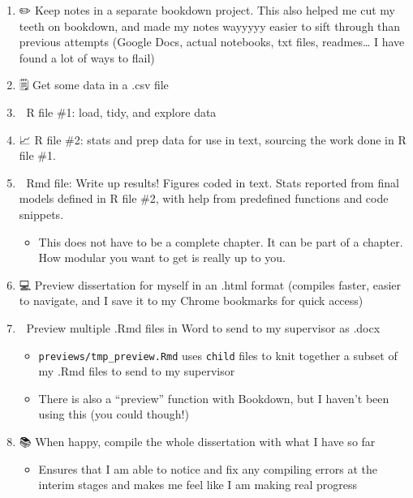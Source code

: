 \documentclass[
  12pt,
  oneside]{book}
\providecommand{\tightlist}{%
  \setlength{\itemsep}{0pt}\setlength{\parskip}{0pt}}
\numberwithin{figure}{chapter}
\begin{document}
\begin{enumerate}
\def\labelenumi{\arabic{enumi}.}
\setcounter{enumi}{-1}
\item
  ✏️
  Keep notes in a separate bookdown project. This also helped me cut my teeth on bookdown, and made my notes wayyyyy easier to sift through than previous attempts (Google Docs, actual notebooks, txt files, readmes\ldots{} I have found a lot of ways to flail)
\item
  🗒
  Get some data in a .csv file
\item
  🧹
  R file \#1: load, tidy, and explore data
\item
  📈
  R file \#2: stats and prep data for use in text, sourcing the work done in R file \#1.
\item
  📖
  Rmd file: Write up results! Figures coded in text. Stats reported from final models defined in R file \#2, with help from predefined functions and code snippets.

  \begin{itemize}
  \tightlist
  \item
    This does not have to be a complete chapter. It can be part of a chapter. How modular you want to get is really up to you.
  \end{itemize}
\item
  💻
  Preview dissertation for myself in an .html format (compiles faster, easier to navigate, and I save it to my Chrome bookmarks for quick access)
\item
  📝
  Preview multiple .Rmd files in Word to send to my supervisor as .docx

  \begin{itemize}
  \tightlist
  \item
    \texttt{previews/tmp\_preview.Rmd} uses \texttt{child} files to knit together a subset of my .Rmd files to send to my supervisor
  \item
    There is also a ``preview'' function with Bookdown, but I haven't been using this (you could though!)
  \end{itemize}
\item
  📚
  When happy, compile the whole dissertation with what I have so far

  \begin{itemize}
  \tightlist
  \item
    Ensures that I am able to notice and fix any compiling errors at the interim stages and makes me feel like I am making real progress
  \end{itemize}
\end{enumerate}
\end{document}
